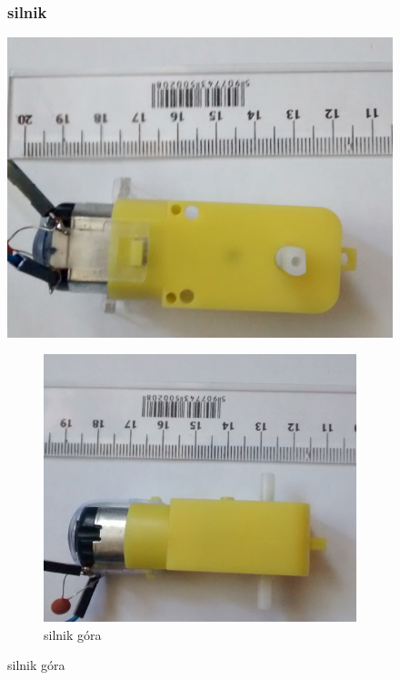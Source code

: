 \documentclass[a4paper,11pt]{article}
\def\SCALE{0.6}
\begin{document}
\begin{figure}[H]
	\subsubsection{silnik}
	\centering
	\includegraphics[width=\SCALE
	\paperwidth]{silnik-bok}
	\caption{silnik bok}
	
	\begin{figure}[H]
		\centering
		\includegraphics[width=\SCALE
		\paperwidth]{silnik-gora}
		\caption{silnik góra}
	\end{figure}
	
\end{figure}
\end{document}
